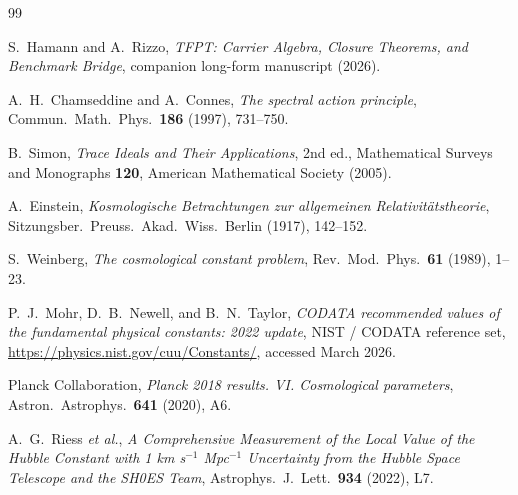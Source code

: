 \documentclass[aps,prl,reprint,superscriptaddress,longbibliography,nofootinbib,floatfix]{revtex4-2}
\begin{document}
\begin{thebibliography}{99}

S.~Hamann and A.~Rizzo,
\emph{TFPT: Carrier Algebra, Closure Theorems, and Benchmark Bridge},
companion long-form manuscript (2026).

A.~H.~Chamseddine and A.~Connes,
\emph{The spectral action principle},
Commun.\ Math.\ Phys.\ \textbf{186} (1997), 731--750.

B.~Simon,
\emph{Trace Ideals and Their Applications},
2nd ed., Mathematical Surveys and Monographs \textbf{120}, American Mathematical Society (2005).

A.~Einstein,
\emph{Kosmologische Betrachtungen zur allgemeinen Relativit\"atstheorie},
Sitzungsber.\ Preuss.\ Akad.\ Wiss.\ Berlin (1917), 142--152.

S.~Weinberg,
\emph{The cosmological constant problem},
Rev.\ Mod.\ Phys.\ \textbf{61} (1989), 1--23.

P.~J.~Mohr, D.~B.~Newell, and B.~N.~Taylor,
\emph{CODATA recommended values of the fundamental physical constants: 2022 update},
NIST / CODATA reference set, \url{https://physics.nist.gov/cuu/Constants/}, accessed March 2026.

Planck Collaboration,
\emph{Planck 2018 results. VI. Cosmological parameters},
Astron.\ Astrophys.\ \textbf{641} (2020), A6.

A.~G.~Riess \textit{et al.},
\emph{A Comprehensive Measurement of the Local Value of the Hubble Constant with 1 km s$^{-1}$ Mpc$^{-1}$ Uncertainty from the Hubble Space Telescope and the SH0ES Team},
Astrophys.\ J.\ Lett.\ \textbf{934} (2022), L7.

\end{thebibliography}
\end{document}
